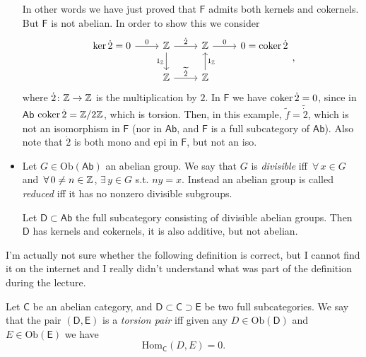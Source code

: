 \begin{ex}
\begin{itemize}
			In other words we have just proved that $\mathsf{F}$ admits both kernels and cokernels.
			But $\mathsf{F}$ is not abelian.
			In order to show this we consider
			\begin{equation}
			\begin{tikzcd}
				\ker \dot{2} = 0 \arrow[r, "0", rightarrow] & \Z \arrow[r, "\dot{2}", rightarrow] \arrow[d, "1_\Z"', rightarrow] &
				\Z \arrow[r, "0", rightarrow] & 0 = \coker \dot{2}\\
				 & \Z \arrow[r, "\widetilde{\dot{2}}", rightarrow] & \Z \arrow[u, "1_\Z"', rightarrow] & 
			\end{tikzcd}
			,\end{equation} 
			where $\dot{2}\colon \mathbb{Z} \to \mathbb{Z}$ is the multiplication by $2$.
			In $\mathsf{F}$ we have $\operatorname{coker} \dot{2} = 0$, since in $\mathsf{Ab}$ $\operatorname{coker} \dot{2} = \mathbb{Z}/2\mathbb{Z}$, which is torsion.
			Then, in this example, $\widetilde{f} = \widetilde{\dot{2}}$, which is not an isomorphism in $\mathsf{F}$ 
			(nor in $\mathsf{Ab}$, and $\mathsf{F}$ is a full subcategory of $\mathsf{Ab}$).
			Also note that $\dot{2}$ is both mono and epi in $\mathsf{F}$, but not an iso.


		\item Let $G \in \mathrm{Ob} \left(\mathsf{Ab}\right)$ an abelian group. 
			We say that $G$ is {\em divisible} iff $\,\forall\, x \in G$ and $\,\forall\,  0 \neq n \in \mathbb{Z}$, $\exists\, y \in G$ s.t. $ny = x$.
			Instead an abelian group is called {\em reduced} iff it has no nonzero divisible subgroups.

			Let $\mathsf{D} \subset \mathsf{Ab}$ the full subcategory consisting of divisible abelian groups.
			Then $\mathsf{D}$ has kernels and cokernels, it is also additive, but not abelian.
	\end{itemize}
\end{ex} 

I'm actually not sure whether the following definition is correct, but I cannot find it on the internet and I really didn't understand what was part of the definition during the lecture.
\begin{defn}
	Let $\mathsf{C}$ be an abelian category, and $\mathsf{D} \subset \mathsf{C} \supset \mathsf{E}$ be two full subcategories.
	We say that the pair $\left(\mathsf{D}, \mathsf{E}\right)$ is a {\em torsion pair} iff given any $D \in \mathrm{Ob} \left(\mathsf{D}\right)$ and $E \in \mathrm{Ob} \left(\mathsf{E}\right)$ we have
	\begin{equation}
	\mathrm{Hom}_{\mathsf{C}} \left( D, E \right) = 0
	.\end{equation} 
\end{defn}

